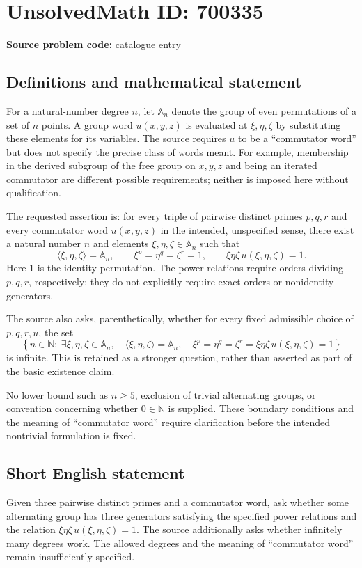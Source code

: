 \documentclass[11pt]{article}
\newcommand{\N}{\mathbb{N}}
\begin{document}
\section*{UnsolvedMath ID: 700335}
\textbf{Source problem code:} catalogue entry
\subsection{Definitions and mathematical statement}
For a natural-number degree \(n\), let \(\mathbb{A}_n\) denote the group of even permutations of a set of \(n\) points. A group word \(u(x,y,z)\) is evaluated at \(\xi,\eta,\zeta\) by substituting these elements for its variables. The source requires \(u\) to be a ``commutator word'' but does not specify the precise class of words meant. For example, membership in the derived subgroup of the free group on \(x,y,z\) and being an iterated commutator are different possible requirements; neither is imposed here without qualification.

The requested assertion is: for every triple of pairwise distinct primes \(p,q,r\) and every commutator word \(u(x,y,z)\) in the intended, unspecified sense, there exist a natural number \(n\) and elements \(\xi,\eta,\zeta\in\mathbb{A}_n\) such that
\[
\langle\xi,\eta,\zeta\rangle=\mathbb{A}_n,
\qquad
\xi^p=\eta^q=\zeta^r=1,
\qquad
\xi\eta\zeta\,u(\xi,\eta,\zeta)=1.
\]
Here \(1\) is the identity permutation. The power relations require orders dividing \(p,q,r\), respectively; they do not explicitly require exact orders or nonidentity generators.

The source also asks, parenthetically, whether for every fixed admissible choice of \(p,q,r,u\), the set
\[
\left\{n\in\N:\ \exists\xi,\eta,\zeta\in\mathbb{A}_n,\quad
\langle\xi,\eta,\zeta\rangle=\mathbb{A}_n,\quad
\xi^p=\eta^q=\zeta^r=\xi\eta\zeta\,u(\xi,\eta,\zeta)=1
\right\}
\]
is infinite. This is retained as a stronger question, rather than asserted as part of the basic existence claim.

No lower bound such as \(n\geq5\), exclusion of trivial alternating groups, or convention concerning whether \(0\in\N\) is supplied. These boundary conditions and the meaning of ``commutator word'' require clarification before the intended nontrivial formulation is fixed.
\subsection{Short English statement}
Given three pairwise distinct primes and a commutator word, ask whether some alternating group has three generators satisfying the specified power relations and the relation \(\xi\eta\zeta\,u(\xi,\eta,\zeta)=1\). The source additionally asks whether infinitely many degrees work. The allowed degrees and the meaning of ``commutator word'' remain insufficiently specified.
\end{document}
